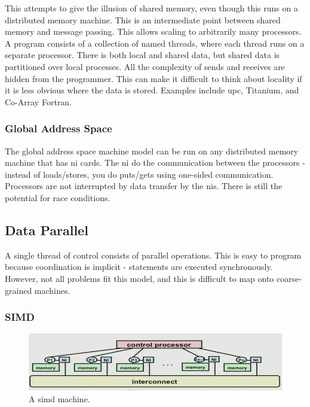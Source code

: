 \documentclass[10pt]{article}
\begin{document}
\begin{flushleft}
This attempts to give the illusion of shared memory, even though this runs on a distributed memory machine. This is an intermediate point between shared memory and message passing. This allows scaling to arbitrarily many processors. A program consists of a collection of named threads, where each thread runs on a separate processor. There is both local and shared data, but shared data is partitioned over local processes. All the complexity of sends and receives are hidden from the programmer. This can make it difficult to think about locality if it is less obvious where the data is stored. Examples include \gls{upc}, Titanium, and Co-Array Fortran. 

\subsubsection{Global Address Space}

The global address space machine model can be run on any distributed memory machine that has \gls{ni} cards. The \gls{ni} do the communication between the processors - instead of loads/stores, you do puts/gets using one-sided communication. Processors are not interrupted by data transfer by the \gls{ni}s. There is still the potential for race conditions. 

\subsection{Data Parallel}

A single thread of control consists of parallel operations. This is easy to program because coordination is implicit - statements are executed synchronously. However, not all problems fit this model, and this is difficult to map onto coarse-grained machines.

\subsubsection{SIMD}

\begin{figure}[H]
\centering
\includegraphics[width=0.75\linewidth]{figures/simd.pdf}
\caption{A \gls{simd} machine.}
\end{figure}


\end{flushleft}
\end{document}
